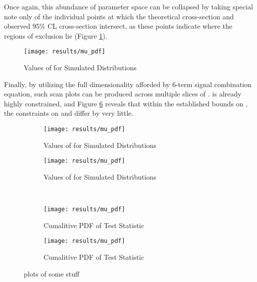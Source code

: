     Once again, this abundance of parameter space can be collapsed by taking special note only of
        the individual points at which the theoretical cross-section and observed 95\% CL cross-section intersect,
        as these points indicate where the regions of exclusion lie (Figure \ref{fig:kvv_kl_2Dscan}).

    \begin{figure} %
        \texttt{[image: results/mu\_pdf]}
        \caption{Values of \qtil for Simulated Distributions}
        \label{fig:kvv_kl_2Dscan}
    \end{figure}

    Finally, by utilizing the full dimensionality afforded by 6-term signal combination equation,
        such scan plots can be produced across multiple slices of \kv.
    \kv is already highly constrained, and Figure \ref{fig:kvv_kl_multislice}
        reveals that within the established bounds on \kv,
        the constraints on \kl and \kvv differ by very little.

    \begin{figure} %
        \centering
        \begin{subfigure}{0.48\textwidth} 
            \texttt{[image: results/mu\_pdf]}
            \caption{Values of \qtil for Simulated Distributions}
            \label{fig:kvv_kl_2Dscan_kv0.96}
        \end{subfigure}
        \begin{subfigure}{0.48\textwidth} 
            \texttt{[image: results/mu\_pdf]}
            \caption{Values of \qtil for Simulated Distributions}
            \label{fig:kvv_kl_2Dscan_kv1}
        \end{subfigure} \\
        \begin{subfigure}{0.48\textwidth}
            \texttt{[image: results/mu\_pdf]}
            \caption{Cumalitive PDF of \qtil Test Statistic}
            \label{fig:kvv_kl_2Dscan_kv1.03}
        \end{subfigure}
        \begin{subfigure}{0.48\textwidth}
            \texttt{[image: results/mu\_pdf]}
            \caption{Cumalitive PDF of \qtil Test Statistic}
            \label{fig:kvv_kl_2Dscan_kv1.06}
        \end{subfigure}
        \caption{
            plots of some stuff
        }\label{fig:kvv_kl_multislice}
    \end{figure}
